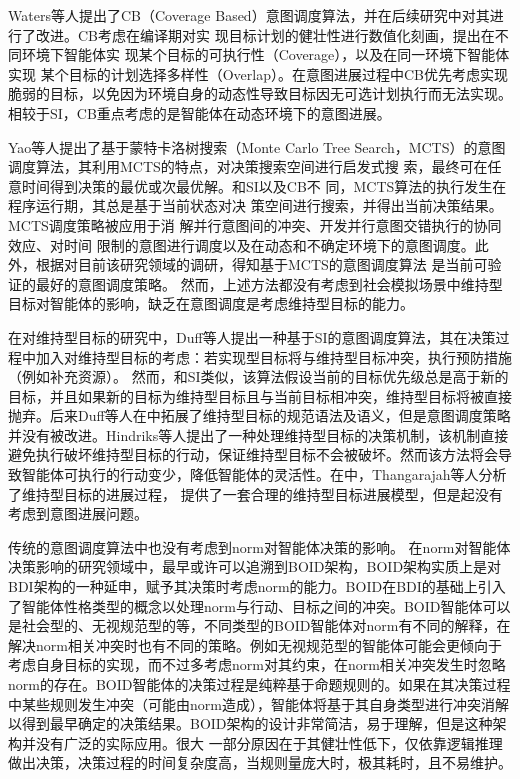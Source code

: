 Waters等人\cite{DBLP:conf/atal/WatersPS14,DBLP:conf/aamas/ThangarajahSP12}提出了CB（Coverage Based）意图调度算法，并在后续研究中对其进行了改进\cite{DBLP:journals/aamas/WatersPS15}。CB考虑在编译期对实 现目标计划的健壮性进行数值化刻画，提出在不同环境下智能体实 现某个目标的可执行性（Coverage），以及在同一环境下智能体实现 某个目标的计划选择多样性（Overlap）。在意图进展过程中CB优先考虑实现脆弱的目标，以免因为环境自身的动态性导致目标因无可选计划执行而无法实现。相较于SI，CB重点考虑的是智能体在动态环境下的意图进展。

Yao等人提出了基于蒙特卡洛树搜索（Monte Carlo Tree Search，MCTS）的意图调度算法\cite{yao2017robust,dblp:conf/ijcai/Yao20,DBLP:conf/atal/YaoL16,DBLP:conf/ecai/YaoLT14,DBLP:conf/aaai/YaoLT16,DBLP:conf/ecai/YaoLT16}，其利用MCTS的特点，对决策搜索空间进行启发式搜 索，最终可在任意时间得到决策的最优或次最优解。和SI以及CB不 同，MCTS算法的执行发生在程序运行期，其总是基于当前状态对决 策空间进行搜索，并得出当前决策结果。MCTS调度策略被应用于消 解并行意图间的冲突、开发并行意图交错执行的协同效应、对时间 限制的意图进行调度以及在动态和不确定环境下的意图调度。此外，根据对目前该研究领域的调研，得知基于MCTS的意图调度算法 是当前可验证的最好的意图调度策略。
然而，上述方法都没有考虑到社会模拟场景中维持型目标对智能体的影响，缺乏在意图调度是考虑维持型目标的能力。


在对维持型目标的研究中，Duff等人提出一种基于SI的意图调度算法\cite{DBLP:conf/atal/DuffHT06}，其在决策过程中加入对维持型目标的考虑：若实现型目标将与维持型目标冲突，执行预防措施（例如补充资源）。 然而，和SI类似，该算法假设当前的目标优先级总是高于新的目标，并且如果新的目标为维持型目标且与当前目标相冲突，维持型目标将被直接抛弃。后来Duff等人在\cite{DBLP:journals/ci/DuffTH14}中拓展了维持型目标的规范语法及语义，但是意图调度策略并没有被改进。Hindriks等人提出了一种处理维持型目标的决策机制\cite{DBLP:conf/dalt/HindriksR07}，该机制直接避免执行破坏维持型目标的行动，保证维持型目标不会被破坏。然而该方法将会导致智能体可执行的行动变少，降低智能体的灵活性。在\cite{DBLP:conf/ecai/ThangarajahHMY14}中，Thangarajah等人分析了维持型目标的进展过程， 提供了一套合理的维持型目标进展模型，但是起没有考虑到意图进展问题。

传统的意图调度算法中也没有考虑到norm对智能体决策的影响。
在norm对智能体决策影响的研究领域中，最早或许可以追溯到BOID架构\cite{DBLP:conf/agents/BroersenDHHT01}，BOID架构实质上是对BDI架构的一种延申，赋予其决策时考虑norm的能力。BOID在BDI的基础上引入了智能体性格类型的概念以处理norm与行动、目标之间的冲突。BOID智能体可以是社会型的、无视规范型的等，不同类型的BOID智能体对norm有不同的解释，在解决norm相关冲突时也有不同的策略。例如无视规范型的智能体可能会更倾向于考虑自身目标的实现，而不过多考虑norm对其约束，在norm相关冲突发生时忽略norm的存在。BOID智能体的决策过程是纯粹基于命题规则的。如果在其决策过程中某些规则发生冲突（可能由norm造成），智能体将基于其自身类型进行冲突消解以得到最早确定的决策结果。BOID架构的设计非常简洁，易于理解，但是这种架构并没有广泛的实际应用。很大 一部分原因在于其健壮性低下，仅依靠逻辑推理做出决策，决策过程的时间复杂度高，当规则量庞大时，极其耗时，且不易维护。


